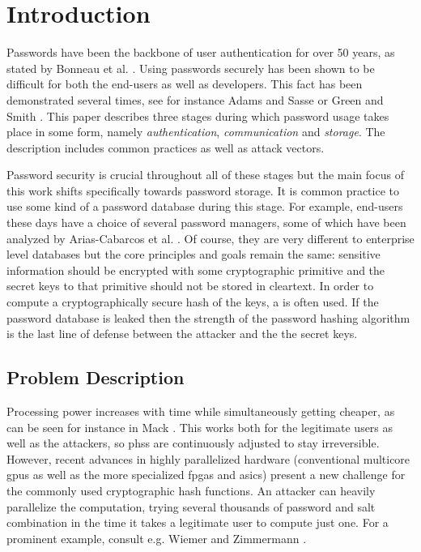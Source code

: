 \chapter{Introduction}
\label{sec:introduction}
Passwords have been the backbone of user authentication for over 50 years, as stated by Bonneau et al. \cite{bonneau:2015:passwords-and-evolution-of-auth}. Using passwords securely has been shown to be difficult for both the end-users as well as developers. This fact has been demonstrated several times, see for instance Adams and Sasse \cite{adams:1999:users-are-not-the-enemy} or Green and Smith \cite{green:2016:developers-are-not-the-enemy}. This paper describes three stages during which password usage takes place in some form, namely \emph{authentication}, \emph{communication} and \emph{storage}. The description includes common practices as well as attack vectors.

Password security is crucial throughout all of these stages but the main focus of this work shifts specifically towards password storage. It is common practice to use some kind of a password database during this stage. For example, end-users these days have a choice of several password managers, some of which have been analyzed by Arias-Cabarcos et al. \cite{arias:2016:comparing}. Of course, they are very different to enterprise level databases but the core principles and goals remain the same: sensitive information should be encrypted with some cryptographic primitive and the secret keys to that primitive should not be stored in cleartext. In order to compute a cryptographically secure hash of the keys, a  is often used. If the password database is leaked then the strength of the password hashing algorithm is the last line of defense between the attacker and the the secret keys.

\section{Problem Description}
Processing power increases with time while simultaneously getting cheaper, as can be seen for instance in Mack \cite{mack:2015:the-multiple-lives-of-moores-law}. This works both for the legitimate users as well as the attackers, so \glspl{phs} are continuously adjusted to stay irreversible. However, recent advances in highly parallelized hardware (conventional multicore \glspl{gpu} as well as the more specialized \glspl{fpga} and \glspl{asic}) present a new challenge for the commonly used cryptographic hash functions. An attacker can heavily parallelize the computation, trying several thousands of password and salt combination in the time it takes a legitimate user to compute just one. For a prominent example, consult e.g. Wiemer and Zimmermann \cite{wiemer:2014:high-speed-bcrypt}.

